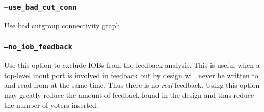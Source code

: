 \subsubsection{\texttt{--use\_bad\_cut\_conn}}
Use bad cutgroup connectivity graph

\subsubsection{\texttt{--no\_iob\_feedback}}
Use this option to exclude IOBs from the feedback analysis. This is useful when
a top-level inout port is involved in feedback but by design will never be 
written to and read from at the same time. Thus there is no \emph{real}
feedback. Using this option may greatly reduce the amount of feedback found in
the design and thus reduce the number of voters inserted.






 
